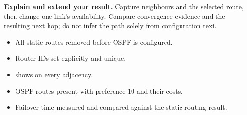 \begin{verification}
\textbf{Explain and extend your result.} Capture neighbours and the selected route, then change one link's availability. Compare convergence evidence and the resulting next hop; do not infer the path solely from configuration text.


\begin{itemize}
  \item All static routes removed before OSPF is configured.
  \item Router IDs set explicitly and unique.
  \item {} shows  on every adjacency.
  \item OSPF routes present with preference 10 and their costs.
  \item Failover time measured and compared against the static-routing result.
\end{itemize}
\end{verification}
